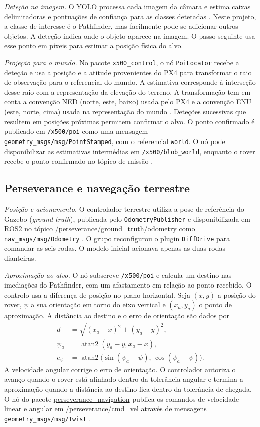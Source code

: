 \documentclass[conference]{IEEEtran}
\begin{document}
\textit{Deteção na imagem.}
O YOLO processa cada imagem da câmara e estima caixas delimitadoras e pontuações de confiança para as classes detetadas \cite{yolo}. Neste projeto, a classe de interesse é o Pathfinder, mas facilmente pode se adicionar outros objetos. A deteção indica onde o objeto aparece na imagem. O passo seguinte usa esse ponto em píxeis para estimar a posição física do alvo.

\textit{Projeção para o mundo.}
No pacote \texttt{x500\_control}, o nó \texttt{PoiLocator} recebe a deteção e usa a posição e a atitude provenientes do PX4 para transformar o raio de observação para o referencial do mundo. A estimativa corresponde à interseção desse raio com a representação da elevação do terreno. A transformação tem em conta a convenção NED (norte, este, baixo) usada pelo PX4 e a convenção ENU (este, norte, cima) usada na representação do mundo \cite{px4-ros2}. Deteções sucessivas que resultem em posições próximas permitem confirmar o alvo. O ponto confirmado é publicado em \texttt{/x500/poi} como uma mensagem \texttt{geometry\_msgs/msg/PointStamped}, com o referencial \texttt{world}. O nó pode disponibilizar as estimativas intermédias em \texttt{/x500/blob\_world}, enquanto o rover recebe o ponto confirmado no tópico de missão \cite{point-stamped}.

\subsection{Perseverance e navegação terrestre}

\textit{Posição e acionamento.}
O controlador terrestre utiliza a pose de referência do Gazebo (\textit{ground truth}), publicada pelo \texttt{OdometryPublisher} e disponibilizada em ROS2 no tópico \url{/perseverance/ground_truth/odometry} como \texttt{nav\_msgs/msg/Odometry} \cite{odom-publisher,odometry}. O grupo reconfigurou o plugin \texttt{DiffDrive} para comandar as seis rodas. O modelo inicial acionava apenas as duas rodas dianteiras.

\textit{Aproximação ao alvo.}
O nó subscreve \texttt{/x500/poi} e calcula um destino nas imediações do Pathfinder, com um afastamento em relação ao ponto recebido. O controlo usa a diferença de posição no plano horizontal. Seja $(x,y)$ a posição do rover, $\psi$ a sua orientação em torno do eixo vertical e $(x_a,y_a)$ o ponto de aproximação. A distância ao destino e o erro de orientação são dados por
\begin{align}
d &= \sqrt{(x_a-x)^2+(y_a-y)^2}, \\
\psi_a &= \operatorname{atan2}(y_a-y, x_a-x), \\
e_\psi &= \operatorname{atan2}\bigl(\sin(\psi_a-\psi),\,
                                   \cos(\psi_a-\psi)\bigr).
\end{align}
A velocidade angular corrige o erro de orientação. O controlador autoriza o avanço quando o rover está alinhado dentro da tolerância angular e termina a aproximação quando a distância ao destino fica dentro da tolerância de chegada. O nó do pacote \url{perseverance_navigation} publica os comandos de velocidade linear e angular em \url{/perseverance/cmd_vel} através de mensagens \texttt{geometry\_msgs/msg/Twist} \cite{twist}.
\end{document}
